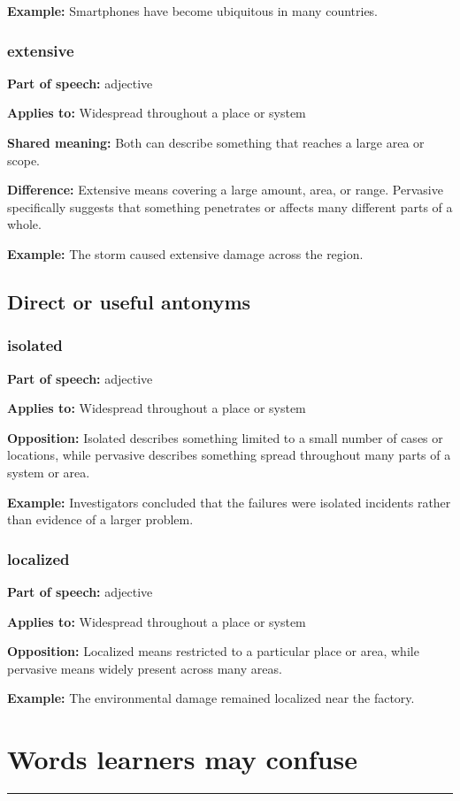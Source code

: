 \documentclass[11pt]{article}
\newcommand{\sectionrule}{\par\vspace{-0.5em}\noindent\textcolor{Accent}{\rule{\linewidth}{0.6pt}}\par}
\begin{document}
\textbf{Example:} Smartphones have become ubiquitous in many countries.

\subsubsection{extensive}
\textbf{Part of speech:} adjective

\textbf{Applies to:} Widespread throughout a place or system

\textbf{Shared meaning:} Both can describe something that reaches a large area or scope.

\textbf{Difference:} Extensive means covering a large amount, area, or range. Pervasive specifically suggests that something penetrates or affects many different parts of a whole.

\textbf{Example:} The storm caused extensive damage across the region.

\subsection{Direct or useful antonyms}
\subsubsection{isolated}
\textbf{Part of speech:} adjective

\textbf{Applies to:} Widespread throughout a place or system

\textbf{Opposition:} Isolated describes something limited to a small number of cases or locations, while pervasive describes something spread throughout many parts of a system or area.

\textbf{Example:} Investigators concluded that the failures were isolated incidents rather than evidence of a larger problem.

\subsubsection{localized}
\textbf{Part of speech:} adjective

\textbf{Applies to:} Widespread throughout a place or system

\textbf{Opposition:} Localized means restricted to a particular place or area, while pervasive means widely present across many areas.

\textbf{Example:} The environmental damage remained localized near the factory.

\section{Words learners may confuse}
\sectionrule
\end{document}
